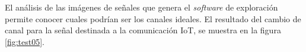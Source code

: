 El análisis de las imágenes de señales que genera el \emph{software} de exploración permite conocer cuales podrían ser los canales ideales. El resultado del cambio de canal para la señal destinada a la comunicación IoT, se muestra en la figura \ref{fig:test05}. 













